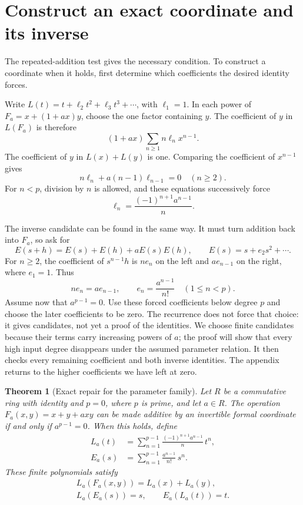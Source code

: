 \documentclass[11pt,letterpaper]{article}
\numberwithin{equation}{section}
\newtheorem{theorem}{Theorem}[section]
\theoremstyle{definition}\newtheorem{example}[theorem]{Example}
\begin{document}
\section{Construct an exact coordinate and its inverse}\label{sec:exact-theorem}

The repeated-addition test gives the necessary condition. To construct a coordinate when it holds, first determine which coefficients the desired identity forces.

Write \(L(t)=t+\ell_2t^2+\ell_3t^3+\cdots\), with \(\ell_1=1\). In each power of \(F_a=x+(1+ax)y\), choose the one factor containing \(y\). The coefficient of \(y\) in \(L(F_a)\) is therefore
\[
 (1+ax)\sum_{n\ge1}n\ell_nx^{n-1}.
\]
The coefficient of \(y\) in \(L(x)+L(y)\) is one. Comparing the coefficient of \(x^{n-1}\) gives
\begin{equation}\label{eq:coefficient-recursion}
 n\ell_n+a(n-1)\ell_{n-1}=0\quad(n\ge2).
\end{equation}
For \(n<p\), division by \(n\) is allowed, and these equations successively force
\[
 \ell_n=\frac{(-1)^{n+1}a^{n-1}}n.
\]

The inverse candidate can be found in the same way. It must turn addition back into \(F_a\), so ask for
\[
 E(s+h)=E(s)+E(h)+aE(s)E(h),\qquad
 E(s)=s+e_2s^2+\cdots.
\]
For \(n\ge2\), the coefficient of \(s^{n-1}h\) is \(ne_n\) on the left and \(ae_{n-1}\) on the right, where \(e_1=1\). Thus
\[
 ne_n=ae_{n-1},\qquad e_n=\frac{a^{n-1}}{n!}\quad(1\le n<p).
\]
Assume now that \(a^{p-1}=0\). Use these forced coefficients below degree \(p\) and choose the later coefficients to be zero. The recurrence does not force that choice: it gives candidates, not yet a proof of the identities. We choose finite candidates because their terms carry increasing powers of \(a\); the proof will show that every high input degree disappears under the assumed parameter relation. It then checks every remaining coefficient and both inverse identities. The appendix returns to the higher coefficients we have left at zero.

\begin{theorem}[Exact repair for the parameter family]\label{thm:family}
Let \(R\) be a commutative ring with identity and \(p=0\), where \(p\) is prime, and let \(a\in R\). The operation \(F_a(x,y)=x+y+a xy\) can be made additive by an invertible formal coordinate if and only if \(a^{p-1}=0\). When this holds, define
\begin{align}
 L_a(t)&=\sum_{n=1}^{p-1}\frac{(-1)^{n+1}a^{n-1}}n\,t^n,
 \label{eq:finite-log}\\
 E_a(s)&=\sum_{n=1}^{p-1}\frac{a^{n-1}}{n!}\,s^n.
 \label{eq:finite-exp}
\end{align}
These finite polynomials satisfy
\begin{gather}
 L_a(F_a(x,y))=L_a(x)+L_a(y),\label{eq:theorem-add}\\
 L_a(E_a(s))=s,\qquad E_a(L_a(t))=t.\label{eq:theorem-inverse}
\end{gather}
\end{theorem}
\end{document}
